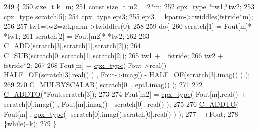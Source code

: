 \begin{DoxyCode}
249     \{
250         \textcolor{keywordtype}{size\_t} k=m;
251         \textcolor{keyword}{const} \textcolor{keywordtype}{size\_t} m2 = 2*m;
252         \hyperlink{classcudafft_a6b6e4901630f197baf4cf7f165543ece}{cpx\_type} *tw1,*tw2;
253         \hyperlink{classcudafft_a6b6e4901630f197baf4cf7f165543ece}{cpx\_type} scratch[5];
254         \hyperlink{classcudafft_a6b6e4901630f197baf4cf7f165543ece}{cpx\_type} epi3;
255         epi3 = kparm->twiddles(fstride*m);
256 
257         tw1=tw2=&kparm->twiddles(0);
258 
259         \textcolor{keywordflow}{do}\{
260             scratch[1] = Fout[m]* *tw1;
261             scratch[2] = Fout[m2]* *tw2;
262 
263             \hyperlink{classcudafft_a014fac9955f6dc417ae80544132f98e4}{C\_ADD}(scratch[3],scratch[1],scratch[2]);
264             \hyperlink{classcudafft_a62e0deba21ac6217451ce410b0029812}{C\_SUB}(scratch[0],scratch[1],scratch[2]);
265             tw1 += fstride;
266             tw2 += fstride*2;
267 
268             Fout[m] = \hyperlink{classcudafft_a6b6e4901630f197baf4cf7f165543ece}{cpx\_type}( Fout->real() - \hyperlink{classcudafft_ad4779f2e310b7ff2f2633c147e06e17c}{HALF\_OF}(scratch[3].real() ) , Fout->imag() - 
      \hyperlink{classcudafft_ad4779f2e310b7ff2f2633c147e06e17c}{HALF\_OF}(scratch[3].imag() ) );
269 
270             \hyperlink{classcudafft_a12bcd921a68025d8b5094bf06221d2c2}{C\_MULBYSCALAR}( scratch[0] , epi3.imag() );
271 
272             \hyperlink{classcudafft_ad4a6c8f97cdf80be567abfceeada59ad}{C\_ADDTO}(*Fout,scratch[3]);
273 
274             Fout[m2] = \hyperlink{classcudafft_a6b6e4901630f197baf4cf7f165543ece}{cpx\_type}(  Fout[m].real() + scratch[0].imag() , Fout[m].imag() - scratch[0].
      real() );
275 
276             \hyperlink{classcudafft_ad4a6c8f97cdf80be567abfceeada59ad}{C\_ADDTO}( Fout[m] , \hyperlink{classcudafft_a6b6e4901630f197baf4cf7f165543ece}{cpx\_type}( -scratch[0].imag(),scratch[0].real() ) );
277             ++Fout;
278         \}\textcolor{keywordflow}{while}(--k);
279     \}
\end{DoxyCode}
